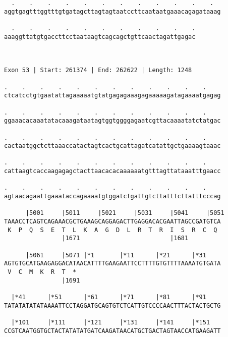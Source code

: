 \documentclass{article}
\begin{document}
\begin{Verbatim}
  .    .    .    .    .    .    .    .    .    .    .    .  
aggtgagtttggtttgtgatagcttagtagtaatccttcaataatgaaacagagataaag
                                                            
  .    .    .    .    .    .    .    .    .    .    .
aaaggttatgtgaccttcctaataagtcagcagctgttcaactagattgagac
                                                     
                                                     
 
Exon 53 | Start: 261374 | End: 262622 | Length: 1248
 
.    .    .    .    .    .    .    .    .    .    .    .    
ctcatcctgtgaatattagaaaaatgtatgagagaaagagaaaaagatagaaaatgagag
                                                            
.    .    .    .    .    .    .    .    .    .    .    .    
ggaaacacaaatatacaaagataatagtggtggggagaatcgttacaaaatatctatgac
                                                            
.    .    .    .    .    .    .    .    .    .    .    .    
cactaatggctcttaaaccatactagtcactgcattagatcatattgctgaaaagtaaac
                                                            
.    .    .    .    .    .    .    .    .    .    .    .    
cattaagtcaccaagagagctacttaacacacaaaaaatgtttagttataaatttgaacc
                                                            
.    .    .    .    .    .    .    .    .    .    .    .    
agtaacagaattgaaataccagaaaatgtggatctgattgtcttatttcttatttcccag
                                                            
      |5001     |5011     |5021     |5031     |5041     |5051
TAAACCTCAGTCAGAAACGCTGAAAGCAGGAGACTTGAGGACACGAATTAGCCGATGTCA
 K  P  Q  S  E  T  L  K  A  G  D  L  R  T  R  I  S  R  C  Q 
                |1671                         |1681         
  
      |5061     |5071 |*1       |*11      |*21      |*31    
AGTGTGCATGAAGAGGACATAACATTTTGAAGAATTCCTTTTGTGTTTTAAAATGTGATA
 V  C  M  K  R  T  *   
                |1691                                       
  
  |*41      |*51      |*61      |*71      |*81      |*91    
TATATATATATAAAATTCCTAGGATGCAGTGTCTCATTGTCCCCAACTTTACTACTGCTG
                                                            
  |*101     |*111     |*121     |*131     |*141     |*151   
CCGTCAATGGTGCTACTATATATGATCAAGATAACATGCTGACTAGTAACCATGAAGATT
                                                            

\end{Verbatim}
\end{document}
